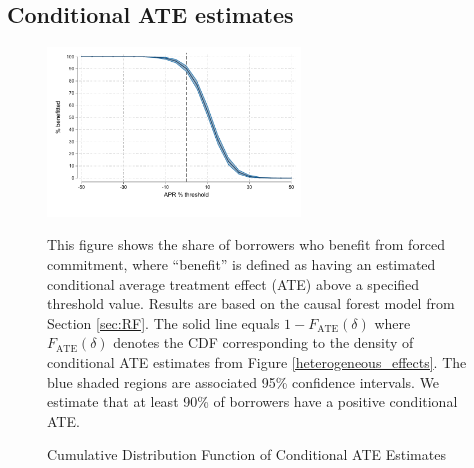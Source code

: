 \subsection{Conditional ATE estimates}

\begin{figure}[H]
    \begin{center}
  \caption{Cumulative Distribution Function of Conditional ATE Estimates}
  \includegraphics[width=0.6\textwidth]{Figuras/cdf_CATE.pdf} 
    \label{fig:CATEsurvival}
    \end{center}
    
    \scriptsize This figure shows the share of borrowers who benefit from forced commitment, where ``benefit'' is defined as having an estimated conditional average treatment effect (ATE) above a specified threshold value. Results are based on the causal forest model from Section \ref{sec:RF}. The solid line equals $1 - F_\text{ATE}(\delta)$ where $F_\text{ATE}(\delta)$ denotes the CDF corresponding to the density of conditional ATE estimates from Figure \ref{heterogeneous_effects}. The blue shaded regions are associated 95\% confidence intervals. We estimate that at least 90\% of borrowers have a positive conditional ATE. 
\end{figure}
 





